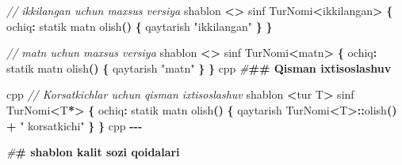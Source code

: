 \documentclass[a4paper,11pt,twoside,openright]{book}
\newenvironment{Shaded}{\begin{snugshade}}{\end{snugshade}}
\newcommand{\CommentTok}[1]{\textcolor[rgb]{0.56,0.35,0.01}{\textit{#1}}}
\newcommand{\ErrorTok}[1]{\textcolor[rgb]{0.64,0.00,0.00}{\textbf{#1}}}
\newcommand{\NormalTok}[1]{#1}
\newcommand{\OperatorTok}[1]{\textcolor[rgb]{0.81,0.36,0.00}{\textbf{#1}}}
\newcommand{\PreprocessorTok}[1]{\textcolor[rgb]{0.56,0.35,0.01}{\textit{#1}}}
\newcommand{\StringTok}[1]{\textcolor[rgb]{0.31,0.60,0.02}{#1}}
\begin{document}
\begin{Shaded}
\begin{Highlighting}[]
\CommentTok{// ikkilangan uchun maxsus versiya}
\NormalTok{shablon }\OperatorTok{\textless{}\textgreater{}}
\NormalTok{sinf TurNomi}\OperatorTok{\textless{}}\NormalTok{ikkilangan}\OperatorTok{\textgreater{}} \OperatorTok{\{}
\NormalTok{ochiq}\OperatorTok{:}
\NormalTok{    statik matn olish}\OperatorTok{()} \OperatorTok{\{}\NormalTok{ qaytarish }\StringTok{"ikkilangan"} \OperatorTok{\}}
\OperatorTok{\}}

\CommentTok{// matn uchun maxsus versiya}
\NormalTok{shablon }\OperatorTok{\textless{}\textgreater{}}
\NormalTok{sinf TurNomi}\OperatorTok{\textless{}}\NormalTok{matn}\OperatorTok{\textgreater{}} \OperatorTok{\{}
\NormalTok{ochiq}\OperatorTok{:}
\NormalTok{    statik matn olish}\OperatorTok{()} \OperatorTok{\{}\NormalTok{ qaytarish }\StringTok{"matn"} \OperatorTok{\}}
\OperatorTok{\}}
\ErrorTok{\textasciigrave{}\textasciigrave{}\textasciigrave{}}\NormalTok{cpp}
\PreprocessorTok{\#}\ErrorTok{\#\# Qisman ixtisoslashuv}

\ErrorTok{\textasciigrave{}\textasciigrave{}\textasciigrave{}}\NormalTok{cpp}
\CommentTok{// Ko\textquotesingle{}rsatkichlar uchun qisman ixtisoslashuv}
\NormalTok{shablon }\OperatorTok{\textless{}}\NormalTok{tur T}\OperatorTok{\textgreater{}}
\NormalTok{sinf TurNomi}\OperatorTok{\textless{}}\NormalTok{T}\OperatorTok{*\textgreater{}} \OperatorTok{\{}
\NormalTok{ochiq}\OperatorTok{:}
\NormalTok{    statik matn olish}\OperatorTok{()} \OperatorTok{\{}
\NormalTok{        qaytarish TurNomi}\OperatorTok{\textless{}}\NormalTok{T}\OperatorTok{\textgreater{}::}\NormalTok{olish}\OperatorTok{()} \OperatorTok{+} \StringTok{" ko\textquotesingle{}rsatkichi"}
    \OperatorTok{\}}
\OperatorTok{\}}
\ErrorTok{\textasciigrave{}\textasciigrave{}\textasciigrave{}}\NormalTok{cpp}
\OperatorTok{{-}{-}{-}}

\PreprocessorTok{\#}\ErrorTok{\# \textasciigrave{}shablon\textasciigrave{} kalit so\textquotesingle{}zi qoidalari}


\end{Highlighting}
\end{Shaded}
\end{document}
